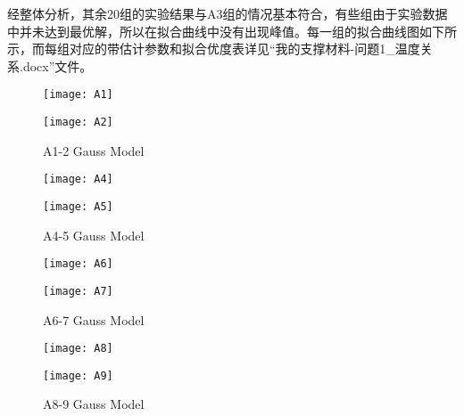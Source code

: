 \documentclass[withoutpreface,bwprint]{cumcmthesis} %
\begin{document}
经整体分析，其余20组的实验结果与A3组的情况基本符合，有些组由于实验数据中并未达到最优解，所以在拟合曲线中没有出现峰值。每一组的拟合曲线图如下所示，而每组对应的带估计参数和拟合优度表详见“我的支撑材料-问题1\_温度关系.docx”文件。

\begin{figure}[!h]
	\centering
	\begin{minipage}[c]{0.45\textwidth}
		\centering
		\texttt{[image: A1]}
		\label{fig:sample-figure-a}
	\end{minipage}
	\begin{minipage}[c]{0.45\textwidth}
		\centering
		\texttt{[image: A2]}
		\label{fig:sample-figure-b}
	\end{minipage}
	\caption{A1-2 Gauss Model}
	\label{fig:sample-figure}
\end{figure}

\newpage
\begin{figure}[!h]
	\centering
	\begin{minipage}[c]{0.45\textwidth}
		\centering
		\texttt{[image: A4]}
		\label{fig:sample-figure-a}
	\end{minipage}
	\begin{minipage}[c]{0.45\textwidth}
		\centering
		\texttt{[image: A5]}
		\label{fig:sample-figure-b}
	\end{minipage}
	\caption{A4-5 Gauss Model}
	\label{fig:sample-figure}
\end{figure}

\begin{figure}[!h]
	\centering
	\begin{minipage}[c]{0.45\textwidth}
		\centering
		\texttt{[image: A6]}
		\label{fig:sample-figure-a}
	\end{minipage}
	\begin{minipage}[c]{0.45\textwidth}
		\centering
		\texttt{[image: A7]}
		\label{fig:sample-figure-b}
	\end{minipage}
	\caption{A6-7 Gauss Model}
	\label{fig:sample-figure}
\end{figure}

\begin{figure}[!h]
	\centering
	\begin{minipage}[c]{0.45\textwidth}
		\centering
		\texttt{[image: A8]}
		\label{fig:sample-figure-a}
	\end{minipage}
	\begin{minipage}[c]{0.45\textwidth}
		\centering
		\texttt{[image: A9]}
		\label{fig:sample-figure-b}
	\end{minipage}
	\caption{A8-9 Gauss Model}
	\label{fig:sample-figure}
\end{figure}
\end{document}
